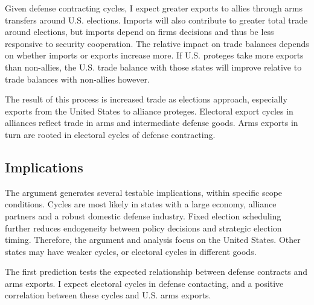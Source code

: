\documentclass[12pt]{article}
\begin{document}


Given defense contracting cycles, I expect greater exports to allies through arms transfers around U.S. elections.
Imports will also contribute to greater total trade around elections, but imports depend on firms decisions and thus be less responsive to security cooperation.
The relative impact on trade balances depends on whether imports or exports increase more. 
If U.S. proteges take more exports than non-allies, the U.S. trade balance with those states will improve relative to trade balances with non-allies however.


The result of this process is increased trade as elections approach, especially exports from the United States to alliance proteges.
Electoral export cycles in alliances reflect trade in arms and intermediate defense goods. 
Arms exports in turn are rooted in electoral cycles of defense contracting.



\subsection{Implications}



The argument generates several testable implications, within specific scope conditions. 
Cycles are most likely in states with a large economy, alliance partners and a robust domestic defense industry. 
Fixed election scheduling further reduces endogeneity between policy decisions and strategic election timing.
Therefore, the argument and analysis focus on the United States. 
Other states may have weaker cycles, or electoral cycles in different goods.


The first prediction tests the expected relationship between defense contracts and arms exports. 
I expect electoral cycles in defense contacting, and a positive correlation between these cycles and U.S. arms exports.
\end{document}
